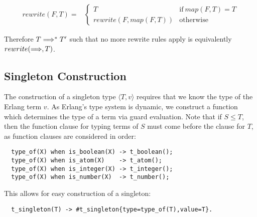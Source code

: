 \documentclass[nonacm,timestamp,manuscript]{acmart}
\newcommand{\singleton}[2]{\langle #1, #2 \rangle} %
\newcommand{\singletonex}{\singleton{T}{v}}
\begin{document}
\begin{align*}
  rewrite(F, T) ={}&
                     \begin{cases}
                       T & \text{if}\ map(F, T) = T \\
                       rewrite(F, map(F, T)) & \text{otherwise}
                     \end{cases}
\end{align*}

Therefore $T \Longrightarrow^{*} T^{\prime}$ such that no more rewrite rules apply is
equivalently $rewrite(\Longrightarrow, T)$.


\subsection{Singleton Construction}

The construction of a singleton type $\singletonex$ requires that we know the
type of the Erlang term $v$. As Erlang's type system is dynamic, we construct
a function which determines the type of a term via guard evaluation. Note that if
$S \le T$, then the function clause for typing terms of $S$ must come before the
clause for $T$, as function clauses are considered in order:

\begin{verbatim}
  type_of(X) when is_boolean(X) -> t_boolean();
  type_of(X) when is_atom(X)    -> t_atom();
  type_of(X) when is_integer(X) -> t_integer();
  type_of(X) when is_number(X)  -> t_number();
\end{verbatim}

This allows for easy construction of a singleton:
\begin{verbatim}
  t_singleton(T) -> #t_singleton{type=type_of(T),value=T}.
\end{verbatim}




\end{document}
